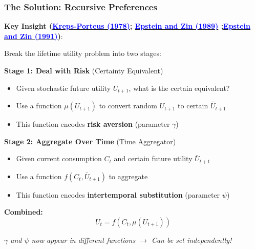 \documentclass{beamer}
\begin{document}
\begin{frame}
    \frametitle{The Solution: Recursive Preferences}
    
    \textbf{Key Insight (\href{https://doi.org/10.2307/1913656}{\textcolor{blue}{Kreps-Porteus (1978)}}; \href{https://doi.org/10.1142/9789814417358_0012}{\textcolor{blue}{Epstein and Zin (1989)}} ;\href{https://www.journals.uchicago.edu/doi/10.1086/261750} {\textcolor{blue}{Epstein and Zin (1991)}})}:
    
    Break the lifetime utility problem into two stages:
    
    
    \textbf{Stage 1: Deal with Risk} (Certainty Equivalent)
    \begin{itemize}
        \item Given stochastic future utility $U_{t+1}$, what is the certain equivalent?
        \item Use a function $\mu(U_{t+1})$ to convert random $U_{t+1}$ to certain $\bar{U}_{t+1}$
        \item This function encodes \textbf{risk aversion} (parameter $\gamma$)
    \end{itemize}
    
    
    \textbf{Stage 2: Aggregate Over Time} (Time Aggregator)
    \begin{itemize}
        \item Given current consumption $C_t$ and certain future utility $\bar{U}_{t+1}$
        \item Use a function $f(C_t, \bar{U}_{t+1})$ to aggregate
        \item This function encodes \textbf{intertemporal substitution} (parameter $\psi$)
    \end{itemize}
    
    
    \textbf{Combined:}
    \begin{equation*}
        \boxed{
        U_t = f(C_t, \mu(U_{t+1}))
        }
    \end{equation*}
    
    
    \textit{$\gamma$ and $\psi$ now appear in different functions $\rightarrow$ Can be set independently!}
    
\end{frame}
\end{document}
